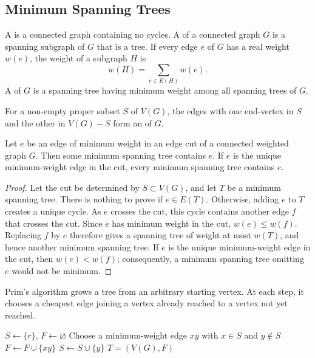 \subsection{Minimum Spanning Trees}\label{subsec:MST}

A  is a connected graph containing no cycles. A  of a connected graph $G$ is a spanning subgraph of $G$ that is a tree. If every edge $e$ of $G$ has a real weight $w(e)$, the weight of a subgraph $H$ is
\begin{equation*}
    w(H)=\sum_{e\in E(H)}w(e).
\end{equation*}
A  of $G$ is a spanning tree having minimum weight among all spanning trees of $G$.

For a non-empty proper subset $S$ of $V(G)$, the edges with one end-vertex in $S$ and the other in $V(G)-S$ form an  of $G$.

\begin{Theorem}\label{thm:CutProperty}
Let $e$ be an edge of minimum weight in an edge cut of a connected weighted graph $G$. Then some minimum spanning tree contains $e$. If $e$ is the unique minimum-weight edge in the cut, every minimum spanning tree contains $e$.
\end{Theorem}

\begin{proof}
Let the cut be determined by $S\subset V(G)$, and let $T$ be a minimum spanning tree. There is nothing to prove if $e\in E(T)$. Otherwise, adding $e$ to $T$ creates a unique cycle. As $e$ crosses the cut, this cycle contains another edge $f$ that crosses the cut. Since $e$ has minimum weight in the cut, $w(e)\le w(f)$. Replacing $f$ by $e$ therefore gives a spanning tree of weight at most $w(T)$, and hence another minimum spanning tree. If $e$ is the unique minimum-weight edge in the cut, then $w(e)<w(f)$; consequently, a minimum spanning tree omitting $e$ would not be minimum.
\end{proof}

Prim's algorithm grows a tree from an arbitrary starting vertex. At each step, it chooses a cheapest edge joining a vertex already reached to a vertex not yet reached.

\begin{algorithm}[H]\caption{Prim's algorithm}\label{alg:Prim}
\begin{algorithmic}[1]
\State $S\gets\{r\}$, $F\gets\varnothing$
    \State Choose a minimum-weight edge $xy$ with $x\in S$ and $y\notin S$
    \State $F\gets F\cup\{xy\}$
    \State $S\gets S\cup\{y\}$
\EndWhile
\State \Return $T=(V(G),F)$
\end{algorithmic}
\end{algorithm}

